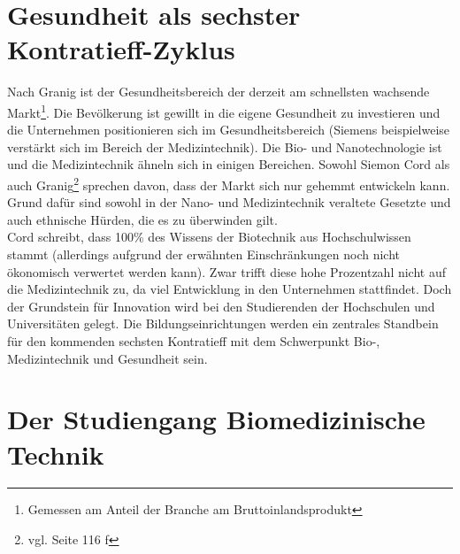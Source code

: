 \section*{Gesundheit als sechster Kontratieff-Zyklus}

Nach Granig\cite{nefiodow:gesundheit} ist der Gesundheitsbereich der derzeit am schnellsten wachsende Markt\footnote{Gemessen am Anteil der Branche am Bruttoinlandsprodukt}. Die Bevölkerung ist gewillt in die eigene Gesundheit zu investieren und die Unternehmen positionieren sich im Gesundheitsbereich (Siemens beispielweise verstärkt sich im Bereich der Medizintechnik).
Die Bio- und Nanotechnologie ist und die Medizintechnik ähneln sich in einigen Bereichen. Sowohl Siemon Cord \cite{cord:innovation} als auch Granig\footnote{vgl. \cite{nefiodow:gesundheit} Seite 116 f} sprechen davon, dass der Markt sich nur gehemmt entwickeln kann. Grund dafür sind sowohl in der Nano- und Medizintechnik veraltete Gesetzte und auch ethnische Hürden, die es zu überwinden gilt.\\
Cord schreibt, dass 100\% des Wissens der Biotechnik aus Hochschulwissen stammt (allerdings aufgrund der erwähnten Einschränkungen noch nicht ökonomisch verwertet werden kann). Zwar trifft diese hohe Prozentzahl nicht auf die Medizintechnik zu, da viel Entwicklung in den Unternehmen stattfindet. Doch der Grundstein für Innovation wird bei den Studierenden der Hochschulen und Universitäten gelegt. Die Bildungseinrichtungen werden ein zentrales Standbein für den kommenden sechsten Kontratieff mit dem Schwerpunkt Bio-, Medizintechnik und Gesundheit sein.

\section*{Der Studiengang Biomedizinische Technik}



